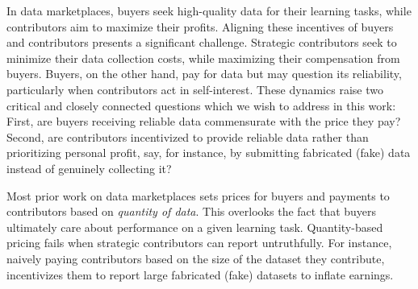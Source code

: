 In data marketplaces, buyers seek high-quality data for their learning tasks, while contributors aim to maximize their profits. Aligning these incentives of buyers and contributors presents a significant challenge.
Strategic contributors seek to minimize their data collection costs, while maximizing their compensation from buyers.
Buyers, on the other hand, pay for data but may question its reliability, particularly when contributors act in self-interest.
These dynamics raise two critical and closely connected questions which we wish to address in this work:
First, are buyers receiving reliable data commensurate with the price they pay?
Second, are contributors incentivized to provide reliable data rather than prioritizing personal profit, say, for instance, by submitting fabricated (fake) data instead of genuinely collecting it?










Most prior work on data marketplaces sets prices for buyers and payments to contributors based on \emph{quantity of data}.
This overlooks the fact that buyers ultimately care about performance on a given learning task.
Quantity-based pricing fails when strategic contributors can report untruthfully.
For instance, naively paying contributors based on the size of the dataset they contribute, incentivizes them to report large fabricated (fake) datasets to inflate earnings.

